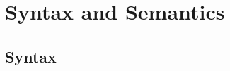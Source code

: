 \chapter[Syntax and semantics][Syntax and semantics]{Syntax {\titlefontsmall and} Semantics}\label{app:syntax-semantics}

\renewcommand{\typerel}[5]{%
    \ifstrempty{#1}%
        {%
            \ifstrempty{#2}%
            {%
                #3 \vdash #4 : #5%
            }{%
                #2 \mid #3 \vdash #4 : #5%
            }%
        }{%
            \ifstrempty{#2}%
            {%
                #1 \mid \emptyset \mid #3 \vdash #4 : #5%
            }{%
                #1 \mid #2 \mid #3 \vdash #4 : #5%
            }%
        }%
}

\section{Syntax}\label{sec:syntax}

